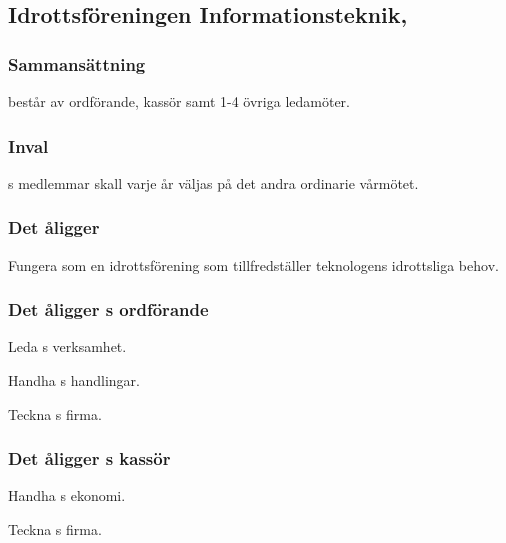 \subsection{Idrottsföreningen Informationsteknik, \FRITID}
\subsubsection{Sammansättning}
\FRITID{} består av ordförande, kassör samt 1-4 övriga ledamöter.

\subsubsection{Inval}
\FRITID{}s medlemmar skall varje år väljas på det andra ordinarie vårmötet.

\subsubsection{Det åligger \FRITID}
\begin{att}
	\item Fungera som en idrottsförening som tillfredställer teknologens idrottsliga behov.
\end{att}

\subsubsection{Det åligger \FRITID{}s ordförande}
\begin{att}
	\item Leda \FRITID{}s verksamhet.
	\item Handha \FRITID{}s handlingar.
	\item Teckna \FRITID{}s firma.
\end{att}

\subsubsection{Det åligger \FRITID{}s kassör}
\begin{att}
	\item Handha \FRITID{}s ekonomi.
	\item Teckna \FRITID{}s firma.
\end{att}